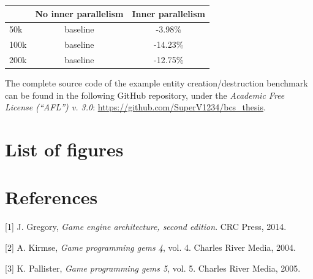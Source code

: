 \documentclass[oneside, 12pt, a4paper, openany]{book}
\begin{document}
\begin{itemize}
  \begin{longtable}[]{@{}lcc@{}}
  \toprule
  \begin{minipage}[b]{0.32\columnwidth}\raggedright\strut
  \strut
  \end{minipage} & \begin{minipage}[b]{0.32\columnwidth}\centering\strut
  No inner parallelism\strut
  \end{minipage} & \begin{minipage}[b]{0.32\columnwidth}\centering\strut
  Inner parallelism\strut
  \end{minipage}\tabularnewline
  \midrule
  \endhead
  50k & baseline & -3.98\%\tabularnewline
  100k & baseline & -14.23\%\tabularnewline
  200k & baseline & -12.75\%\tabularnewline
  \bottomrule
  \end{longtable}
\end{itemize}

The complete source code of the example entity creation/destruction
benchmark can be found in the following GitHub repository, under the
\emph{Academic Free License (``AFL'') v. 3.0}:
\url{https://github.com/SuperV1234/bcs_thesis}.

\chapter*{List of figures}\label{list-of-figures}

\makeatletter
\renewcommand\listoffigures{%
} \makeatother

\listoffigures

\footnotesize
\clearpage
\pagestyle{plain} \fancyhf{} \lhead{} \chead{} \rhead{} \lfoot{}
\cfoot{} \rfoot{}

\chapter*{References}\label{references}

\hypertarget{refs}{}
\hypertarget{ref-gregory2014game}{}
{[}1{]} J. Gregory, \emph{Game engine architecture, second edition}. CRC
Press, 2014.

\hypertarget{ref-game_programming_gems_4}{}
{[}2{]} A. Kirmse, \emph{Game programming gems 4}, vol. 4. Charles River
Media, 2004.

\hypertarget{ref-game_programming_gems_5}{}
{[}3{]} K. Pallister, \emph{Game programming gems 5}, vol. 5. Charles
River Media, 2005.
\end{document}
